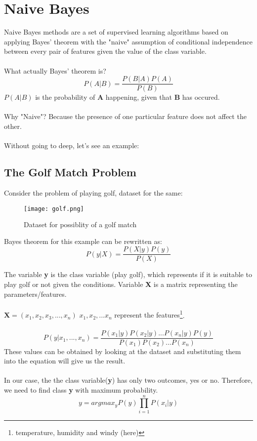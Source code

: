 \section{Naive Bayes}

Naive Bayes methods are a set of supervised learning algorithms based on applying Bayes' theorem with the "naive" assumption of conditional independence between every pair of features given the value of the class variable.\\ \\
What actually Bayes' theorem is?
\begin{equation}\label {eq:bayes}
    P(A|B) = \frac{P(B|A)P(A)}{P(B)}
\end{equation}
$P(A|B)$ is the probability of \textbf{A} happening, given that \textbf{B} has occured.\\ \\ Why "Naive"? Because the presence of one particular feature does not affect the other.
\\ \\ 
Without going to deep, let's see an example:

\subsection{The Golf Match Problem}
    Consider the problem of playing golf, dataset for the same:
    \begin{figure}[h]
        \centering
        \texttt{[image: golf.png]}
        \caption{Dataset for possiblity of a golf match}
    \end{figure}

    Bayes theorem for this example can be rewritten as:
    \begin{equation}
        P(y|X) = \frac{P(X|y)P(y)}{P(X)}
    \end{equation}

    The variable \textbf{y} is the class variable (play golf), which represents if it is suitable to play golf or not given the conditions. Variable \textbf{X} is a matrix representing the parameters/features.
    \\ \\
    $\textbf{X} = (x_1, x_2, x_3, ... , x_n)$ \hfill    \small{$x_1, x_2, ... x_n$ represent the features}\footnote[1]{temperature, humidity and windy (here)}.
    \\ \\

    \begin{equation}
        P(y|x_1, ..., x_n) = \frac{P(x_1|y)P(x_2|y)...P(x_n|y)P(y)}{P(x_1)P(x_2)...P(x_n)}
    \end{equation}
    These values can be obtained by looking at the dataset and substituting them into the equation will give us the result.
    \\ \\
    In our case, the the class variable(\textbf{y}) has only two outcomes, yes or no. Therefore, we need to find class \textbf{y} with maximum probability. 
    \begin{equation}
        y = argmax_yP(y)\prod_{i=1}^{n}P(x_i|y)
    \end{equation}

